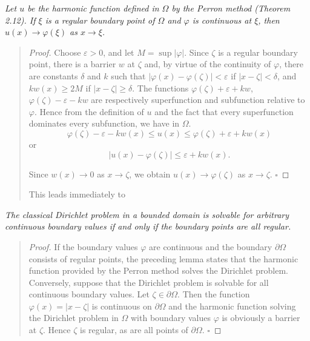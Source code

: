 \begin{lemma}\label{gt.lem2.13}
\textit{Let $u$ be the harmonic function defined in $\Omega$ by the Perron method (Theorem 2.12). If $\xi$ is a regular boundary point of $\Omega$ and $\varphi$ is continuous at $\xi$, then $u(x) \to \varphi(\xi)$ as $x \to \xi$.}

\begin{quote}
    \begin{proof}
Choose $\varepsilon>0$, and let $M=\sup |\varphi|$. Since $\zeta$ is a regular boundary point, there is a barrier $w$ at $\zeta$ and, by virtue of the continuity of $\varphi$, there are constants $\delta$ and $k$ such that $|\varphi(x)-\varphi(\zeta)|<\varepsilon$ if $|x-\zeta|<\delta$, and $kw(x)\geq 2M$ if $|x-\zeta|\geq \delta$. The functions $\varphi(\zeta)+\varepsilon+kw$, $\varphi(\zeta)-\varepsilon-kw$ are respectively superfunction and subfunction relative to $\varphi$. Hence from the definition of $u$ and the fact that every superfunction dominates every subfunction, we have in $\Omega$.
\[
\varphi(\zeta)-\varepsilon-kw(x)\leq u(x)\leq \varphi(\zeta)+\varepsilon+kw(x)
\]
or
\[
|u(x)-\varphi(\zeta)|\leq \varepsilon+kw(x).
\]

Since $w(x)\to 0$ as $x\to \zeta$, we obtain $u(x)\to \varphi(\zeta)$ as $x\to \zeta$. $\square$
\end{proof}
This leads immediately to
\end{quote}
\end{lemma}

\begin{theorem}\label{gt.thm2.14}
\emph{The classical Dirichlet problem in a bounded domain is solvable for arbitrary continuous boundary values if and only if the boundary points are all regular.}

\begin{quote}
\begin{proof}
If the boundary values $\varphi$ are continuous and the boundary $\partial\Omega$ consists of regular points, the preceding lemma states that the harmonic function provided by the Perron method solves the Dirichlet problem. Conversely, suppose that the Dirichlet problem is solvable for all continuous boundary values. Let $\zeta\in\partial\Omega$. Then the function $\varphi(x)=|x-\zeta|$ is continuous on $\partial\Omega$ and the harmonic function solving the Dirichlet problem in $\Omega$ with boundary values $\varphi$ is obviously a barrier at $\zeta$. Hence $\zeta$ is regular, as are all points of $\partial\Omega$. $\square$
\end{proof}
\end{quote}
\end{theorem}

